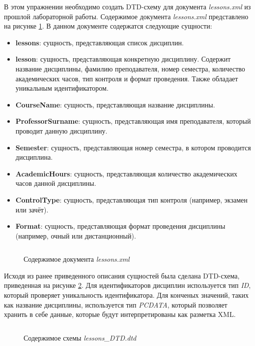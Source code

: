 \documentclass[a4paper, 14pt]{extarticle}
\begin{document}
В этом упражнении необходимо создать DTD-схему для документа
\textit{\foreignlanguage{english}{lessons.xml}} из прошлой лабораторной работы.
Содержимое документа \textit{\foreignlanguage{english}{lessons.xml}}
представлено на рисунке \ref{fig:task-1:lessons.xml}. В данном документе
содержатся следующие сущности:
\begin{itemize}
  \item \textbf{lessons}: сущность, представляющая список дисциплин.
  \item \textbf{lesson}: сущность, представляющая конкретную дисциплину.
  Содержит название дисциплины, фамилию преподавателя, номер семестра,
  количество академических часов, тип контроля и формат проведения. Также
  обладает уникальным идентификатором.
  \item \textbf{CourseName}: сущность, представляющая название дисциплины.
  \item \textbf{ProfessorSurname}: сущность, представляющая имя преподавателя,
  который проводит данную дисциплину.
  \item \textbf{Semester}: сущность, представляющая номер семестра, в котором
  проводится дисциплина.
  \item \textbf{AcademicHours}: сущность, представляющая количество
  академических часов данной дисциплины.
  \item \textbf{ControlType}: сущность, представляющая тип контроля (например,
  экзамен или зачёт).
  \item \textbf{Format}: сущность, представляющая формат проведения дисциплины
  (например, очный или дистанционный).
\end{itemize}

\begin{figure}[H]
  \centering
  \inputminted{xml}{../code/task-1/lessons.xml}
  \caption{Содержимое документа \textit{lessons.xml}}
  \label{fig:task-1:lessons.xml}
\end{figure}

Исходя из ранее приведенного описания сущностей была сделана DTD-схема,
приведенная на рисунке \ref{fig:task-1:lessons_DTD.dtd}. Для идентификаторов
дисциплин используется тип \textit{ID}, который проверяет уникальность
идентификатора. Для конченых значений, таких как название дисциплины,
используется тип \textit{PCDATA}, который позволяет хранить в себе данные,
которые будут интерпретированы как разметка XML.

\begin{figure}[H]
  \centering
  \inputminted{dtd}{../code/task-1/lessons_DTD.dtd}
  \caption{Содержимое схемы \textit{lessons\_DTD.dtd}}
  \label{fig:task-1:lessons_DTD.dtd}
\end{figure}
\end{document}
